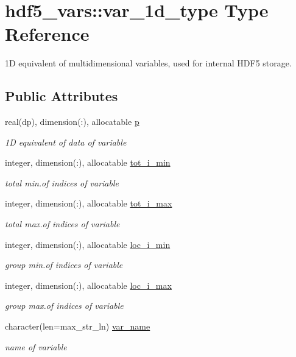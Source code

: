 \hypertarget{structhdf5__vars_1_1var__1d__type}{}\section{hdf5\+\_\+vars\+:\+:var\+\_\+1d\+\_\+type Type Reference}
\label{structhdf5__vars_1_1var__1d__type}


1D equivalent of multidimensional variables, used for internal H\+D\+F5 storage.  


\subsection*{Public Attributes}
\begin{DoxyCompactItemize}
\item 
real(dp), dimension(\+:), allocatable \hyperlink{structhdf5__vars_1_1var__1d__type_aa354f66d1e3684ff1ba18bfbf5197f5f}{p}
\begin{DoxyCompactList}\small\item\em 1D equivalent of data of variable \end{DoxyCompactList}\item 
integer, dimension(\+:), allocatable \hyperlink{structhdf5__vars_1_1var__1d__type_a7f18f0f538910233cf1a09d15a6322f1}{tot\+\_\+i\+\_\+min}
\begin{DoxyCompactList}\small\item\em total min.\+of indices of variable \end{DoxyCompactList}\item 
integer, dimension(\+:), allocatable \hyperlink{structhdf5__vars_1_1var__1d__type_a9bd0a717bed83cef6e892111b55e5a1a}{tot\+\_\+i\+\_\+max}
\begin{DoxyCompactList}\small\item\em total max.\+of indices of variable \end{DoxyCompactList}\item 
integer, dimension(\+:), allocatable \hyperlink{structhdf5__vars_1_1var__1d__type_af7e9da42aee3ad9ec599261f7855c8a9}{loc\+\_\+i\+\_\+min}
\begin{DoxyCompactList}\small\item\em group min.\+of indices of variable \end{DoxyCompactList}\item 
integer, dimension(\+:), allocatable \hyperlink{structhdf5__vars_1_1var__1d__type_a18540fc95d6a5a271f99b26a4df0f798}{loc\+\_\+i\+\_\+max}
\begin{DoxyCompactList}\small\item\em group max.\+of indices of variable \end{DoxyCompactList}\item 
character(len=max\+\_\+str\+\_\+ln) \hyperlink{structhdf5__vars_1_1var__1d__type_a009a09790edf48ec2176bd7fce3abed9}{var\+\_\+name}
\begin{DoxyCompactList}\small\item\em name of variable \end{DoxyCompactList}\end{DoxyCompactItemize}


